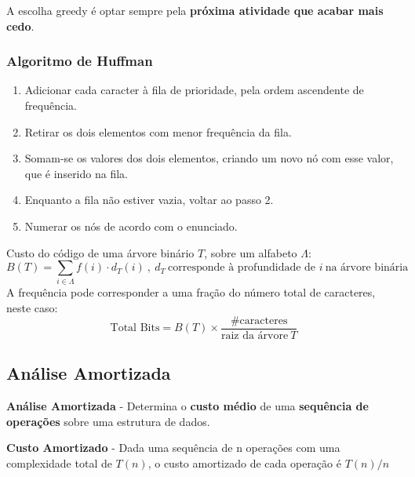 \documentclass[11pt]{article}
\begin{document}
A escolha greedy é optar sempre pela \textbf{próxima atividade que acabar mais cedo}.

\subsubsection{Algoritmo de Huffman}

\begin{enumerate}
    \item Adicionar cada caracter à fila de prioridade, pela ordem ascendente de frequência.
    \item Retirar os dois elementos com menor frequência da fila.
    \item Somam-se os valores dos dois elementos, criando um novo nó com esse valor, que é inserido na fila.
    \item Enquanto a fila não estiver vazia, voltar ao passo 2.
    \item Numerar os nós de acordo com o enunciado.
\end{enumerate}

Custo do código de uma árvore binário $T$, sobre um alfabeto $\Lambda $:
\begin{equation*}
    B(T)=\sum_{i \in \Lambda} f(i) \cdot d_T(i)\ ,\ d_T\ \text{corresponde à profundidade de } i\ \text{na árvore binária}
\end{equation*}
A frequência pode corresponder a uma fração do número total de caracteres, neste caso:
\begin{equation*}
    \text{Total Bits} =
    B(T)\times\frac{\text{\#caracteres}}{\text{raiz da árvore}\ T}
\end{equation*}

\newpage

\subsection{Análise Amortizada} 

\textbf{Análise Amortizada} - Determina o \textbf{custo médio} de uma \textbf{sequência de operações} sobre uma estrutura de dados.

\textbf{Custo Amortizado} - Dada uma sequência de n operações com uma complexidade total de $T(n)$, o custo amortizado de cada operação é $T(n)/n$

\vspace{8pt}
\end{document}
